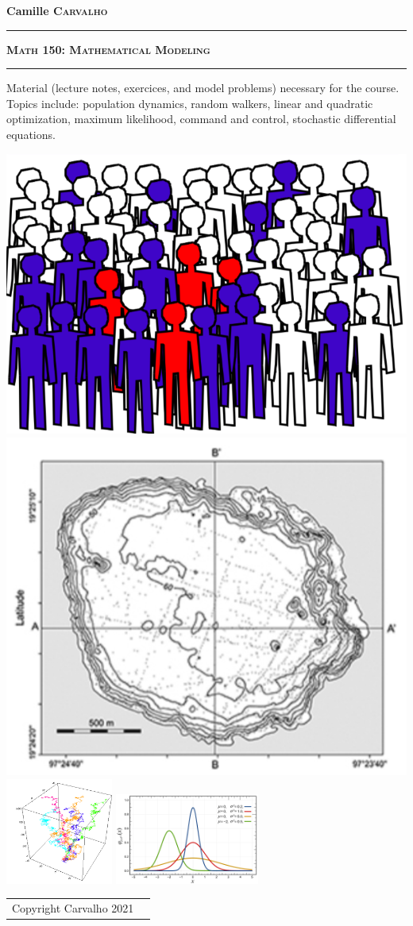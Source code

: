 \documentclass[11pt,twoside,titlepage]{book}
\theoremstyle{plain}
\begin{document}
\begin{titlepage}
\begin{center}
\vspace{\baselineskip}
\vspace{\baselineskip}
\vspace{\baselineskip}
\Large \textbf{Camille \textsc{Carvalho}}
\vspace{\baselineskip}
\rule{\linewidth}{1.5 pt}
\begin{center}
\textsc{\textbf{Math 150: Mathematical Modeling} }
\end{center}
\rule{\linewidth}{1.5 pt}
\vfill
\large Material (lecture notes, exercices, and model problems) necessary for the course. Topics include: population dynamics, random walkers, linear and quadratic optimization, maximum likelihood, command and control, stochastic differential equations.
\end{center}
\vspace{\baselineskip}
\includegraphics[height=3 cm]{logos/pop.png}\hfill
\includegraphics[height=3.5 cm]{logos/heat_eq.png}\hfill
\includegraphics[height=3.5cm]{logos/rw.png}\hfill
\includegraphics[height=3cm]{logos/standard_normal.png}
\vfill
\begin{center}
\begin{tabular}{ll}
Copyright Carvalho 2021 
\end{tabular}
\end{center}
\end{titlepage}
\end{document}
